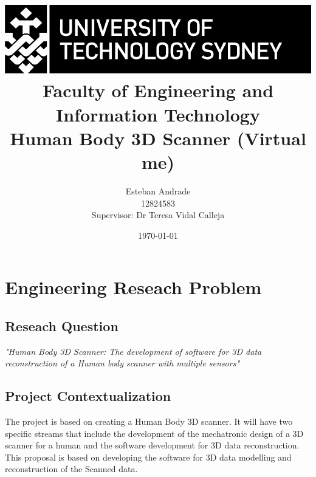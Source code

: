 \documentclass[12pt]{report}
\begin{document}
\begin{titlepage}

   

    \title{ \includegraphics[scale=1.7]{utslogo.jpg}\\[1cm]  
    Faculty of Engineering and Information Technology\\[1.0cm] 
    \Large{\textbf{Human Body 3D Scanner (Virtual me)}}\\}
    \author{Esteban Andrade\\ 
    12824583\\
    Supervisor: Dr Teresa Vidal Calleja\\}
    \date{\today}  
     \maketitle
     \cleardoublepage
\end{titlepage}

\tableofcontents
\listoffigures
\listoftables
\thispagestyle{empty}
\newpage
\setcounter{page}{1}

\chapter{Engineering Reseach Problem}

\section{Reseach Question}
\textit{\large{"Human Body 3D Scanner: The development of software for 3D data reconstruction of a Human body scanner with multiple sensors" }}

\section{Project Contextualization}
The project is based on creating a Human Body 3D scanner.
It will have two specific streams that include the development of the mechatronic design of a 3D scanner for a human and the software development for 3D data reconstruction. 
This proposal is based on developing the software for 3D data modelling and reconstruction of the Scanned data.
\end{document}
